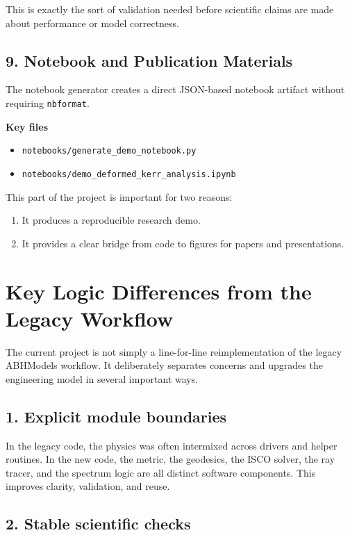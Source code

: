 \documentclass[11pt]{article}
\begin{document}
This is exactly the sort of validation needed before scientific claims are made about performance or model correctness.

\subsection{9. Notebook and Publication Materials}

The notebook generator creates a direct JSON-based notebook artifact without requiring \texttt{nbformat}.

\textbf{Key files}

\begin{itemize}[leftmargin=1.5em]
    \item \texttt{notebooks/generate_demo_notebook.py}
    \item \texttt{notebooks/demo_deformed_kerr_analysis.ipynb}
\end{itemize}

This part of the project is important for two reasons:

\begin{enumerate}[leftmargin=1.5em]
    \item It produces a reproducible research demo.
    \item It provides a clear bridge from code to figures for papers and presentations.
\end{enumerate}

\section{Key Logic Differences from the Legacy Workflow}

The current project is not simply a line-for-line reimplementation of the legacy ABHModels workflow. It deliberately separates concerns and upgrades the engineering model in several important ways.

\subsection{1. Explicit module boundaries}

In the legacy code, the physics was often intermixed across drivers and helper routines. In the new code, the metric, the geodesics, the ISCO solver, the ray tracer, and the spectrum logic are all distinct software components. This improves clarity, validation, and reuse.

\subsection{2. Stable scientific checks}
\end{document}

